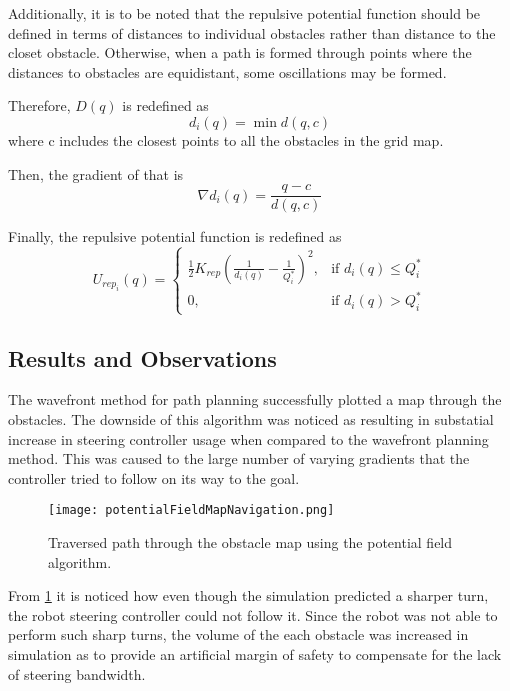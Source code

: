 \documentclass[11pt]{article} %
\begin{document}
Additionally, it is to be noted that the repulsive potential function should be defined in terms of distances to individual obstacles rather than distance to the closet obstacle.  Otherwise, when a path is formed through points where the distances to obstacles are equidistant, some oscillations may be formed.

Therefore, $D(q)$ is redefined as
\begin{equation}
	d_i(q) = \min d(q,c)
\end{equation}
where c includes the closest points to all the obstacles in the grid map.

Then, the gradient of that is
\begin{equation}
	\nabla d_i(q) = \frac{q-c}{d(q,c)}
\end{equation}

Finally, the repulsive potential function is redefined as
\begin{equation}
	U_{rep_{i}}(q) = 
	\begin{cases}
		\frac{1}{2}K_{rep}(\frac{1}{d_i(q)}-\frac{1}{Q_i^*})^2, & \mbox{if } d_i(q) \leq Q_i^* \\
		0 ,& \mbox{if } d_i(q) > Q_i^*
	\end{cases}
\end{equation}

\subsection{Results and Observations}
The wavefront method for path planning successfully plotted a map through the obstacles.
The downside of this algorithm was noticed as resulting in substatial increase in steering controller usage
when compared to the wavefront planning method. This was caused to the large number of varying
gradients that the controller tried to follow on its way to the goal.

\begin{figure}[hbt]
 \centering
 \texttt{[image: potentialFieldMapNavigation.png]}
 \caption{Traversed path through the obstacle map using the potential field algorithm.}
 \label{potFieldMap}
\end{figure}

From \ref{potFieldMap} it is noticed how even though the simulation predicted a sharper turn, 
the robot steering controller could not follow it. Since the robot was not able to perform 
such sharp turns, the volume of the each obstacle was increased in simulation as to provide an artificial
margin of safety to compensate for the lack of steering bandwidth.
\end{document}
